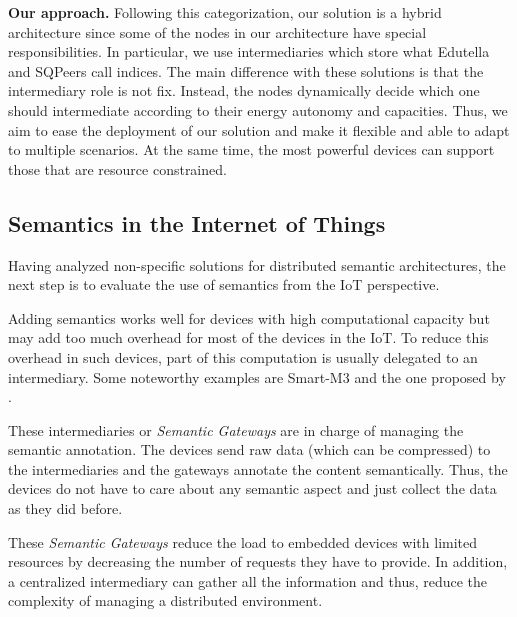 \noindent\textbf{Our approach.}
Following this categorization, our solution is a hybrid architecture since some of the nodes in our architecture have special responsibilities.
In particular, we use intermediaries which store what Edutella and SQPeers call indices.
The main difference with these solutions is that the intermediary role is not fix. %
Instead, the nodes dynamically decide which one should intermediate according to their energy autonomy and capacities.
Thus, we aim to ease the deployment of our solution and make it flexible and able to adapt to multiple scenarios.
At the same time, the most powerful devices can support those that are resource constrained.


\subsection{Semantics in the Internet of Things}
Having analyzed non-specific solutions for distributed semantic architectures, the next step is to evaluate the use of semantics from the IoT perspective.

Adding semantics works well for devices with high computational capacity but may add too much overhead for most of the devices in the IoT.
To reduce this overhead in such devices, part of this computation is usually delegated to an intermediary.
Some noteworthy examples are Smart-M3 \citep{honkola_smart-m3_2010} and the one proposed by \citet{broring_semantic_2009}.

These intermediaries or \emph{Semantic Gateways} are in charge of managing the semantic annotation.
The devices send raw data (which can be compressed) to the intermediaries and the gateways annotate the content semantically.
Thus, the devices do not have to care about any semantic aspect and just collect the data as they did before.

These \emph{Semantic Gateways} reduce the load to embedded devices with limited resources by decreasing the number of requests they have to provide.
In addition, a centralized intermediary can gather all the information and thus, reduce the complexity of managing a distributed environment.

